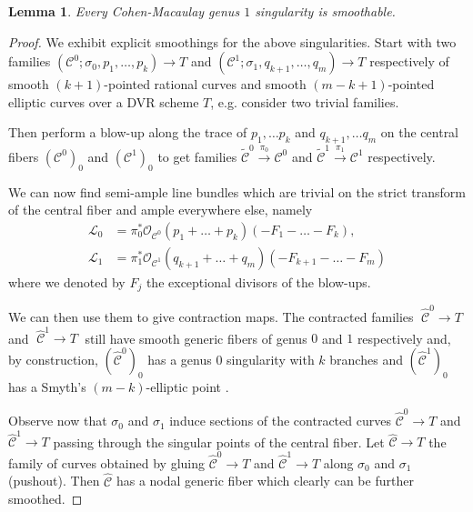 \documentclass[11pt]{amsart}
\newcommand{\OO}{\mathcal O}
\renewcommand{\to}{\rightarrow}
\newcommand{\cC}{\mathcal C}
\theoremstyle{plain}
\newtheorem{lem}[thm]{Lemma}
\theoremstyle{definition}
\begin{document}
\begin{lem}
Every Cohen-Macaulay genus $1$ singularity is smoothable.
\end{lem}
\begin{proof}
We exhibit explicit smoothings for the above singularities.
Start with two families $(\cC^0;\sigma_0,p_1,\ldots,p_k)\to T$ and $(\cC^1;\sigma_1,q_{k+1},\ldots,q_m)\to T$ respectively of smooth $(k+1)$-pointed rational curves and smooth $(m-k+1)$-pointed elliptic curves over a DVR scheme $T$, e.g. consider two trivial families.

 Then perform a blow-up along the trace of $p_1,\dots p_k$ and $q_{k+1},\dots q_{m}$ on the central fibers  $(\cC^0)_0$ and $(\cC^1)_0$ to get families $\widetilde{\cC}^0\xrightarrow{\pi_0} {\cC}^0$ and $\widetilde{\cC}^1\xrightarrow{\pi_1} {\cC}^1$ respectively.
 
We can now find semi-ample line bundles which are trivial on the strict transform of the central fiber and ample everywhere else, namely
\begin{align*}
\mathcal L_0&=\pi_0^*\OO_{\cC^0}(p_1+\ldots+ p_k)(-F_1-\ldots -F_k),\\
 \mathcal L_1&=\pi_1^*\OO_{\cC^1}(q_{k+1}+\ldots+ q_{m})(-F_{k+1}-\ldots -F_{m})
\end{align*}
where we denoted by $F_j$ the exceptional divisors of the blow-ups.

We can then use them to give contraction maps. The contracted families   $\;\hat{\cC}^0\to T\;$ and $\;\hat{\cC}^1\to T\;$ still have smooth generic fibers of genus $0$ and $1$ respectively and, by construction, $(\hat{\cC}^0)_0$ has a genus $0$ singularity with $k$ branches and $(\hat{\cC}^1)_0$ has a Smyth's $(m-k)$-elliptic point \cite[Lemma~2.12]{SMY1}.

Observe now that $\sigma_0$ and $\sigma_1$ induce sections of the contracted curves $\hat{\cC}^0\to T$ and $\hat{\cC}^1\to T$ passing through the singular points of the central fiber. Let $\hat{\cC}\to T$ the family of curves obtained by gluing $\hat{\cC}^0\to T$ and $\hat{\cC}^1\to T$ along $\sigma_0$ and $\sigma_1$ (pushout). Then $\hat{\cC}$ has a nodal generic fiber which clearly can be further smoothed.
\end{proof}
\end{document}
